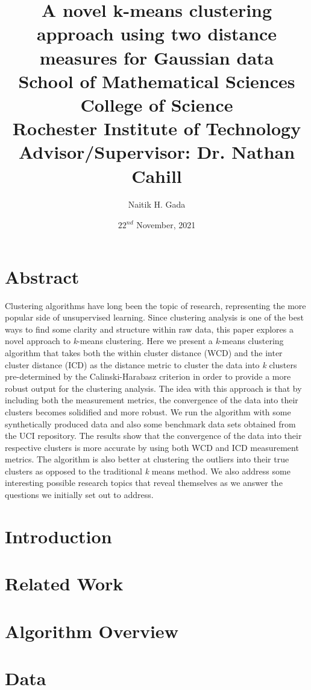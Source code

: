 \documentclass[12pt]{report}
\title{
    {A novel k-means clustering approach using two distance measures for Gaussian data}  \\
    {\small School of Mathematical Sciences}\\
    {\small College of Science} \\
    {\small Rochester Institute of Technology}
    {\small Advisor/Supervisor: Dr. Nathan Cahill}
    }
\author{Naitik H. Gada}
\date{$22^{nd}$ November, 2021}
\begin{document}
\maketitle

\chapter*{Abstract}
Clustering algorithms have long been the topic of research, representing the more popular side of unsupervised learning. Since clustering analysis is one of the best ways to find some clarity and structure within raw data, this paper explores a novel approach to \textit{k}-means clustering. Here we present a \textit{k}-means clustering algorithm that takes both the within cluster distance (WCD) and the inter cluster distance (ICD) as the distance metric to cluster the data into \emph{k} clusters pre-determined by the Calinski-Harabasz criterion in order to provide a more robust output for the clustering analysis. The idea with this approach is that by including both the measurement metrics, the convergence of the data into their clusters becomes solidified and more robust. We run the algorithm with some synthetically produced data and also some benchmark data sets obtained from the UCI repository. The results show that the convergence of the data into their respective clusters is more accurate by using both WCD and ICD measurement metrics. The algorithm is also better at clustering the outliers into their true clusters as opposed to the traditional \textit{k} means method. We also address some interesting possible research topics that reveal themselves as we answer the questions we initially set out to address. 

\tableofcontents


\chapter{Introduction}


\chapter{Related Work}



\chapter{Algorithm Overview}


\chapter{Data}

\end{document}
